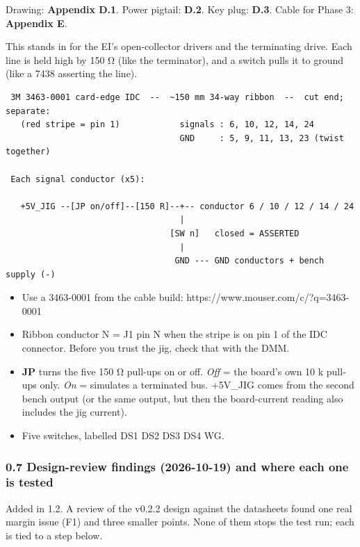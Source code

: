 \documentclass[
  10pt,
  twoside]{article}
\providecommand{\tightlist}{%
  \setlength{\itemsep}{0pt}\setlength{\parskip}{0pt}}
\begin{document}
Drawing: \textbf{Appendix D.1}. Power pigtail: \textbf{D.2}.
Key plug: \textbf{D.3}. Cable for Phase 3: \textbf{Appendix
E}.

This stands in for the EI's open-collector drivers and the
terminating drive. Each line is held high by 150 Ω (like the
terminator), and a switch pulls it to ground (like a 7438
asserting the line).

\begin{verbatim}
 3M 3463-0001 card-edge IDC  --  ~150 mm 34-way ribbon  --  cut end; separate:
   (red stripe = pin 1)            signals : 6, 10, 12, 14, 24
                                   GND     : 5, 9, 11, 13, 23 (twist together)

 Each signal conductor (x5):

   +5V_JIG --[JP on/off]--[150 R]--+-- conductor 6 / 10 / 12 / 14 / 24
                                   |
                                 [SW n]   closed = ASSERTED
                                   |
                                  GND --- GND conductors + bench supply (-)
\end{verbatim}

\begin{itemize}
\tightlist
\item
  Use a 3463-0001 from the cable build:
  https://www.mouser.com/c/?q=3463-0001
\item
  Ribbon conductor N = J1 pin N when the stripe is on pin 1
  of the IDC connector. Before you trust the jig, check that
  with the DMM.
\item
  \textbf{JP} turns the five 150 Ω pull-ups on or off.
  \emph{Off} = the board's own 10 k pull-ups only. \emph{On}
  = simulates a terminated bus. +5V\_JIG comes from the
  second bench output (or the same output, but then the
  board-current reading also includes the jig current).
\item
  Five switches, labelled DS1 DS2 DS3 DS4 WG.
\end{itemize}

\clearpage
\hypertarget{design-review-findings-2026-10-19-and-where-each-one-is-tested}{%
\subsubsection{0.7 Design-review findings (2026-10-19) and
where each one is
tested}\label{design-review-findings-2026-10-19-and-where-each-one-is-tested}}

\textcolor[HTML]{0040A0}{Added in 1.2. A review of the
v0.2.2 design against the datasheets found one real margin
issue (F1) and three smaller points. None of them stops the
test run; each is tied to a step below.}
\end{document}
